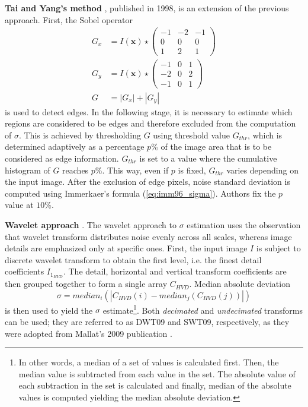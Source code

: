 \documentclass[12pt,notitlepage]{report}
\begin{document}
\noindent \textbf{Tai and Yang's method} \cite{tai08}, published in 1998, is an extension of the previous approach. First, the Sobel operator
\begin{equation}
\label{eq:tai08_sobel}
\begin{aligned}
	G_x &= I(\mathbf{x}) \star \begin{pmatrix} -1 & -2 & - 1 \\ 0 & 0 & 0 \\ 1 & 2 & 1 \end{pmatrix} \\
	G_y &= I(\mathbf{x}) \star \begin{pmatrix} -1 & 0 & 1 \\ -2 & 0 & 2 \\ -1 & 0 & 1 \end{pmatrix} \\
	G &= |G_x| + |G_y|
\end{aligned}
\end{equation}
is used to detect edges. In the following stage, it is necessary to estimate which regions are considered to be edges and therefore excluded from the computation of $\sigma$. This is achieved by thresholding $G$ using threshold value $G_{thr}$, which is determined adaptively as a percentage $p$\% of the image area that is to be considered as edge information. $G_{thr}$ is set to a value where the cumulative histogram of $G$ reaches $p$\%. This way, even if $p$ is fixed, $G_{thr}$ varies depending on the input image. After the exclusion of edge pixels, noise standard deviation is computed using Immerkaer's formula (\ref{eq:imm96_sigma}). Authors fix the $p$ value at $10$\%. 

\noindent \textbf{Wavelet approach} \cite{mall09}. The wavelet approach to $\sigma$ estimation uses the observation that wavelet transform distributes noise evenly across all scales, whereas image details are emphasized only at specific ones. First, the input image $I$ is subject to discrete wavelet transform to obtain the first level, i.e. the finest detail coefficients $I_{1_{HVD}}$. The detail, horizontal and vertical transform coefficients are then grouped together to form a single array $C_{HVD}$. Median absolute deviation 
\begin{equation}
\label{eq:mall09_sigma}
	\sigma = median_i( | C_{HVD}(i) - median_j(C_{HVD}(j))|)
\end{equation}
is then used to yield the $\sigma$ estimate\footnote[3]{In other words, a median of a set of values is calculated first. Then, the median value is subtracted from each value in the set. The absolute value of each subtraction  in the set is calculated and finally, median of the absolute values is computed yielding the median absolute deviation.}. Both {\em decimated} and {\em undecimated} transforms can be used; they are referred to as DWT09 and SWT09, respectively, as they were adopted from Mallat's 2009 publication \cite{mall09}.
\end{document}
